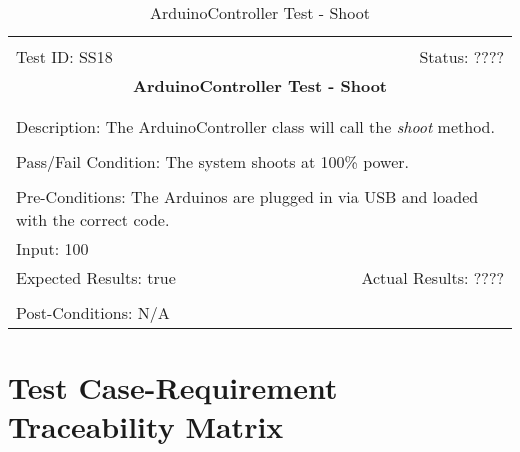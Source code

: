 \documentclass[11pt]{article}
\begin{document}
\begin{center}
\begin{table}[H]
\begin{tabular}{|l r|}\hline&\\[-2mm]
	Test ID: SS18	&Status: ????\\[-3mm]
	\multicolumn{2}{|c|}{\textbf{\large{ArduinoController Test - Shoot}}}\\&\\\hline&\\[-3mm]
	\multicolumn{2}{|p{\textwidth}|}{Description: The ArduinoController class will call the \textit{shoot} method.}\\[1mm]\hline&\\[-3mm]
	\multicolumn{2}{|p{\textwidth}|}{Pass/Fail Condition: The system shoots at 100\% power.}\\[1mm]\hline&\\[-3mm]
	\multicolumn{2}{|p{\textwidth}|}{Pre-Conditions: The Arduinos are plugged in via USB and loaded with the correct code.}\\[4mm]
	\multicolumn{2}{|p{\textwidth}|}{Input: 100}\\[2mm]\hline
	\multicolumn{1}{|p{0.49\textwidth}}{Expected Results: true}	&\multicolumn{1}{|p{0.45\textwidth}|}{Actual Results: ????}\\\hline&\\[-3mm]
	\multicolumn{2}{|p{\textwidth}|}{Post-Conditions: N/A}\\\hline
\end{tabular}
\caption{ArduinoController Test - Shoot}
\end{table}
\end{center}

\section{Test Case-Requirement Traceability Matrix}
\end{document}
